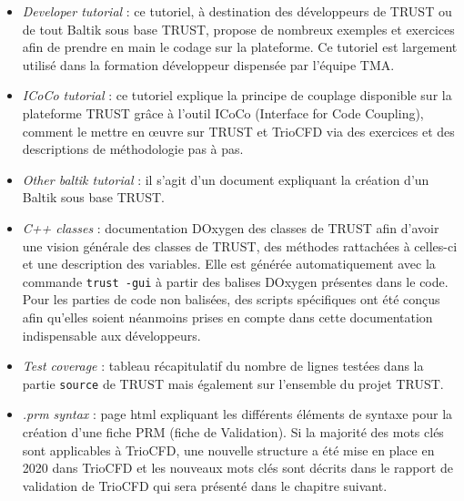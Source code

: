 \begin{itemize}[label=$\Rightarrow$, font=\LARGE]
  \begin{itemize}
    \item \textit{Developer tutorial} : ce tutoriel, à destination des développeurs de TRUST ou de tout Baltik sous base TRUST, propose de nombreux exemples et exercices afin de prendre en main le codage sur la plateforme. Ce tutoriel est largement utilisé dans la formation développeur dispensée par l'équipe TMA.
    \item \textit{ICoCo tutorial} : ce tutoriel explique la principe de couplage disponible sur la plateforme TRUST grâce à l'outil ICoCo (Interface for Code Coupling), comment le mettre en œuvre sur TRUST et TrioCFD via des exercices et des descriptions de méthodologie pas à pas.
    \item \textit{Other baltik tutorial} : il s'agit d'un document expliquant la création d'un Baltik sous base TRUST.
    \item \textit{C++ classes} : documentation DOxygen des classes de TRUST afin d'avoir une vision générale des classes de TRUST, des méthodes rattachées à celles-ci et une description des variables. Elle est générée automatiquement avec la commande \texttt{trust -gui} à partir des balises DOxygen présentes dans le code. Pour les parties de code non balisées, des scripts spécifiques ont été conçus afin qu'elles soient néanmoins prises en compte dans cette documentation indispensable aux développeurs.
    \item \textit{Test coverage} : tableau récapitulatif du nombre de lignes testées dans la partie \texttt{source} de TRUST mais également sur l'ensemble du projet TRUST.
    \item \textit{.prm syntax} : page html expliquant les différents éléments de syntaxe pour la création d'une fiche PRM (fiche de Validation). Si la majorité des mots clés sont applicables à TrioCFD, une nouvelle structure a été mise en place en 2020 dans TrioCFD et les nouveaux mots clés sont décrits dans le rapport de validation de TrioCFD qui sera présenté dans le chapitre suivant.
  \end{itemize}
\end{itemize} 
  
  
